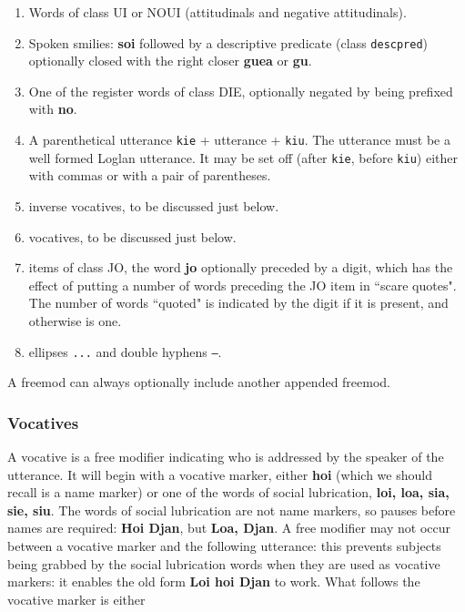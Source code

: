 \documentclass[12pt]{book}
\begin{document}
\begin{enumerate}

\item  Words of class UI or NOUI (attitudinals and negative attitudinals).

\item  Spoken smilies:  {\bf soi} followed by a descriptive predicate (class {\tt descpred}) optionally closed with the right closer {\bf guea} or {\bf gu}.

\item  One of the register words of class DIE, optionally negated by being prefixed with {\bf no}.

\item  A parenthetical utterance {\tt kie} + utterance + {\tt kiu}.  The utterance must be a well formed Loglan utterance.  It may be set off (after {\tt kie}, before {\tt kiu}) either with commas or with a pair of parentheses.

\item inverse vocatives, to be discussed just below.

\item  vocatives, to be discussed just below.

\item  items of class JO, the word {\bf jo} optionally preceded by a digit, which has the effect of putting a number of words preceding the JO item in ``scare quotes".  The number of words ``quoted" is indicated by the digit if it is present, and otherwise is one.

\item ellipses {\tt ...} and double hyphens {\tt --}.

\end{enumerate}

A freemod can always optionally include another appended freemod.

\subsubsection{Vocatives}

A vocative is a free modifier indicating who is addressed by the speaker of the utterance.  It will begin with a vocative marker, either
{\bf hoi} (which we should recall is a name marker) or one of the words of social lubrication, {\bf loi, loa, sia, sie, siu}.  The words of social lubrication are not name markers, so pauses before names are required:  {\bf Hoi Djan}, but {\bf Loa, Djan}.  A free modifier may not occur between a vocative marker and the following utterance:  this prevents subjects being grabbed by the social lubrication words when they are used as vocative markers:  it enables the old form {\bf Loi hoi Djan} to work.  What follows the vocative marker is either 
\end{document}
